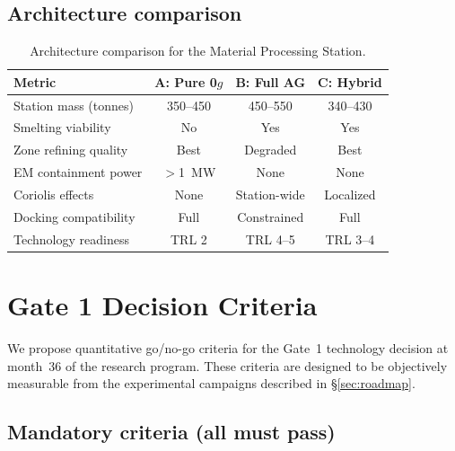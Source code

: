 \documentclass[preprint,12pt]{elsarticle}
\begin{document}
\subsection{Architecture comparison}

\begin{table}[ht]
\centering
\caption{Architecture comparison for the Material Processing Station.}
\label{tab:architecture-comparison}
\begin{tabular}{lccc}
\toprule
\textbf{Metric} & \textbf{A: Pure 0$g$} & \textbf{B: Full AG} & \textbf{C: Hybrid} \\
\midrule
Station mass (tonnes) & 350--450 & 450--550 & 340--430 \\
Smelting viability & No & Yes & Yes \\
Zone refining quality & Best & Degraded & Best \\
EM containment power & $>$1~MW & None & None \\
Coriolis effects & None & Station-wide & Localized \\
Docking compatibility & Full & Constrained & Full \\
Technology readiness & TRL 2 & TRL 4--5 & TRL 3--4 \\
\bottomrule
\end{tabular}
\end{table}

\section{Gate 1 Decision Criteria}
\label{sec:gate1}

We propose quantitative go/no-go criteria for the Gate~1 technology decision at month~36 of the research program. These criteria are designed to be objectively measurable from the experimental campaigns described in \S\ref{sec:roadmap}.

\subsection{Mandatory criteria (all must pass)}
\end{document}
